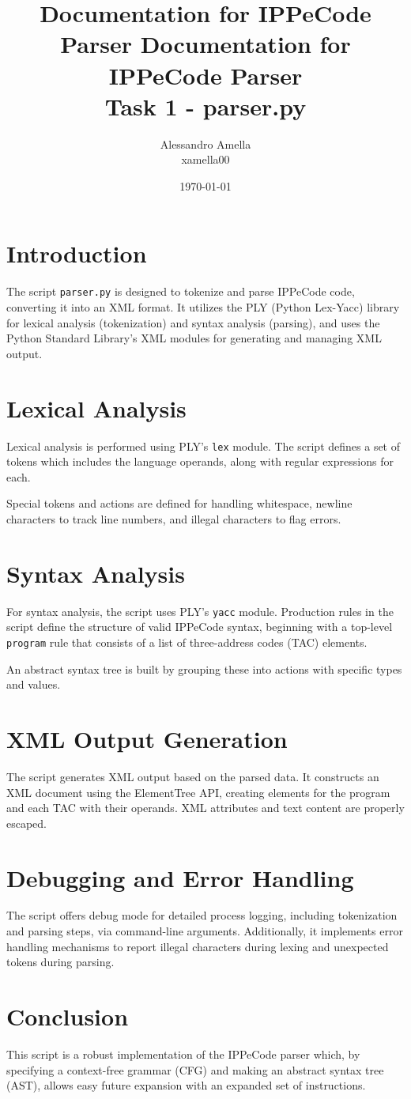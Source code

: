 \documentclass{article}
\title{Documentation for IPPeCode Parser}
\title{%
  Documentation for IPPeCode Parser \\
  \large Task 1 - parser.py}
\author{Alessandro Amella\\xamella00}
\date{\today}
\begin{document}
\maketitle

\section{Introduction}
The script \texttt{parser.py} is designed to tokenize and parse IPPeCode code, converting it into an XML format. It utilizes the PLY (Python Lex-Yacc) library for lexical analysis (tokenization) and syntax analysis (parsing), and uses the Python Standard Library's XML modules for generating and managing XML output.

\section{Lexical Analysis}
Lexical analysis is performed using PLY's \texttt{lex} module. The script defines a set of tokens which includes the language operands, along with regular expressions for each.

Special tokens and actions are defined for handling whitespace, newline characters to track line numbers, and illegal characters to flag errors.

\section{Syntax Analysis}
For syntax analysis, the script uses PLY's \texttt{yacc} module. Production rules in the script define the structure of valid IPPeCode syntax, beginning with a top-level \texttt{program} rule that consists of a list of three-address codes (TAC) elements.

An abstract syntax tree is built by grouping these into actions with specific types and values.

\section{XML Output Generation}
The script generates XML output based on the parsed data. It constructs an XML document using the ElementTree API, creating elements for the program and each TAC with their operands. XML attributes and text content are properly escaped.

\section{Debugging and Error Handling}
The script offers debug mode for detailed process logging, including tokenization and parsing steps, via command-line arguments. Additionally, it implements error handling mechanisms to report illegal characters during lexing and unexpected tokens during parsing.

\section{Conclusion}
This script is a robust implementation of the IPPeCode parser which, by specifying a context-free grammar (CFG) and making an abstract syntax tree (AST), allows easy future expansion with an expanded set of instructions.
\end{document}
